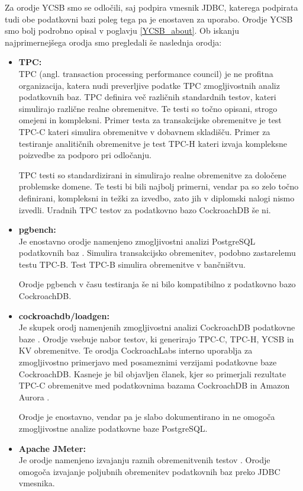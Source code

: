 \documentclass[a4paper, 12pt]{book}
\begin{document}
Za orodje YCSB smo se odločili, saj podpira vmesnik JDBC, katerega podpirata tudi obe podatkovni bazi poleg tega pa je enostaven za uporabo. Orodje YCSB smo bolj podrobno opisal v poglavju \ref{YCSB_about}. Ob iskanju najprimernejšega orodja smo pregledali še naslednja orodja:

\begin{itemize}
    \item \textbf{TPC:}\\ TPC (angl. transaction processing performance council) \cite{TPC-home} je ne profitna organizacija, katera nudi preverljive podatke TPC zmogljivostnih analiz podatkovnih baz. TPC definira več različnih standardnih testov, kateri simulirajo različne realne obremenitve. Te testi so točno opisani, strogo omejeni in kompleksni. Primer testa za transakcijske obremenitve je test TPC-C kateri simulira obremenitve v dobavnem skladišču. Primer za testiranje analitičnih obremenitve je test TPC-H kateri izvaja kompleksne poizvedbe za podporo pri odločanju.
    
    TPC testi so standardizirani in simulirajo realne obremenitve za dolo\-čene problemske domene. Te testi bi bili najbolj primerni, vendar pa so zelo točno definirani, kompleksni in težki za izvedbo, zato jih v diplomski nalogi nismo izvedli. Uradnih TPC testov za podatkovno bazo CockroachDB še ni.
    \item \textbf{pgbench:}\\ Je enostavno orodje namenjeno zmogljivostni analizi PostgreSQL podatkovnih baz \cite{pgbench}. Simulira transakcijsko obremenitev, podobno zastarelemu testu TPC-B. Test TPC-B simulira obremenitve v bančni\-štvu. 
    
    Orodje pgbench v času testiranja še ni bilo kompatibilno z podatkovno bazo CockroachDB.
    \item \textbf{cockroachdb/loadgen:}\\ Je skupek orodj namenjenih zmogljivostni analizi CockroachDB podatkovne baze \cite{cockroachdb/loadgen}. Orodje vsebuje nabor testov, ki generirajo TPC-C, TPC-H, YCSB in KV obremenitve. Te orodja CockroachLabs interno uporablja za zmogljivostno primerjavo med posameznimi verzijami podatkovne baze CockroachDB. Kasneje je bil objavljen članek, kjer so primerjali rezultate TPC-C obremenitve med podatkovnima bazama CockroachDB in Amazon Aurora \cite{CRDB-tpcc-vs-aurora}.

    Orodje je enostavno, vendar pa je slabo dokumentirano in ne omogoča zmogljivostne analize podatkovne baze PostgreSQL.
    \item \textbf{Apache JMeter:}\\ Je orodje namenjeno izvajanju raznih obremenitvenih testov \cite{jmeter}. Orod\-je omogoča izvajanje poljubnih obremenitev podatkovnih baz preko JDBC vmesnika.
    

\end{itemize}
\end{document}

